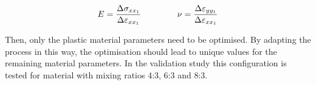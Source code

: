 \begin{gather}\label{eq: EandNu}
    E = \frac{\Delta\sigma_{xx_1}}{\Delta\varepsilon_{xx_1}} \hspace{1.5cm}
    \nu = \frac{\Delta\varepsilon_{yy_1}}{\Delta\varepsilon_{xx_1}}
\end{gather}
    
Then, only the plastic material parameters need to be optimised. By adapting the process in this way, the optimisation should lead to unique values for the remaining material parameters. In the validation study this configuration is tested for material with mixing ratios 4:3, 6:3 and 8:3. \\


















